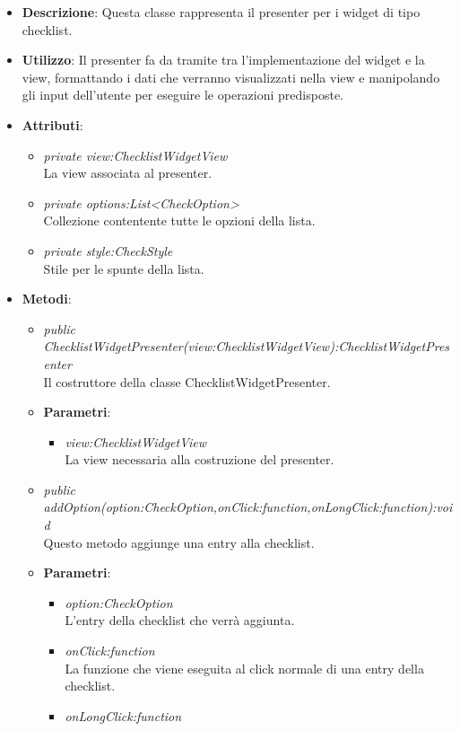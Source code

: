\begin{itemize}
\item \textbf{Descrizione}: Questa classe rappresenta il presenter per i widget di tipo checklist.
\item \textbf{Utilizzo}: Il presenter fa da tramite tra l'implementazione del widget e la view, formattando i dati che verranno visualizzati nella view e manipolando gli input dell'utente per eseguire le operazioni predisposte.
\item \textbf{Attributi}:
	\begin{itemize}
	\item \textit{private view:ChecklistWidgetView}\\
	La view associata al presenter.
	\item \textit{private options:List<CheckOption>}\\
	Collezione contentente tutte le opzioni della lista.
	\item \textit{private style:CheckStyle}\\
	Stile per le spunte della lista.
	\end{itemize}
\item \textbf{Metodi}:
	\begin{itemize}
	\item \textit{public ChecklistWidgetPresenter(view:ChecklistWidgetView):ChecklistWidgetPresenter}\\
	Il costruttore della classe ChecklistWidgetPresenter.
		\item{\textbf{Parametri}: \begin{itemize}
		\item \textit{view:ChecklistWidgetView}\\
		La view necessaria alla costruzione del presenter.
		\end{itemize}}
	\item \textit{public addOption(option:CheckOption,onClick:function,onLongClick:function):void}\\
	Questo metodo aggiunge una entry alla checklist.
		\item{\textbf{Parametri}: \begin{itemize}
		\item \textit{option:CheckOption}\\
		L'entry della checklist che verrà aggiunta.
		\item \textit{onClick:function}\\
		La funzione che viene eseguita al click normale di una entry della checklist.
		\item \textit{onLongClick:function}\\

\end{itemize}}
\end{itemize}
\end{itemize}
